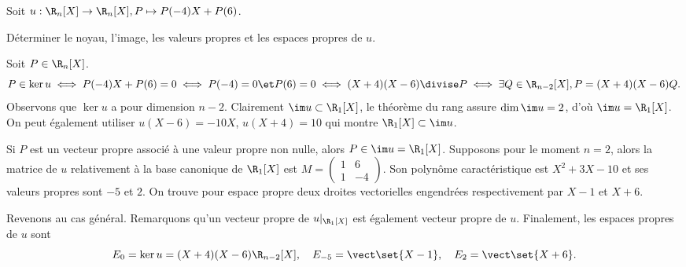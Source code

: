 \begin{enonce}
\begin{exercise}[ID={RMS121/1119 CCP PC},subtitle={},tags={mpsi}, difficulty={0}]
Soit $u:\R_n[X]\to\R_n[X], P\mapsto P(-4)X+P(6)$.

Déterminer le noyau, l'image, les valeurs propres et les espaces propres de $u$.
\end{exercise}
\begin{solution}
Soit $P\in\R_n[X]$.
\begin{equation*}
P\in\ker u
\iff P(-4)X+P(6)=0
\iff P(-4)=0 \et P(6)=0
\iff (X+4)(X-6) \divise P
\iff \exists Q\in\R_{n-2}[X], P=(X+4)(X-6)Q.
\end{equation*}
Observons que $\ker u$ a pour dimension $n-2$. Clairement $\im u\subset \R_1[X]$, le théorème du rang assure $\dim\im u=2$, d'où $\im u=\R_1[X]$. On peut également utiliser $u(X-6)=-10X$, $u(X+4)=10$ qui montre $\R_1[X]\subset\im u$.

Si $P$ est un vecteur propre associé à une valeur propre non nulle, alors $P\in\im u=\R_1[X]$. Supposons pour le moment $n=2$, alors la matrice de $u$ relativement à la base canonique de $\R_1[X]$ est
$M=\begin{pmatrix} 1& 6\\ 1&-4 \end{pmatrix}$.
Son polynôme caractéristique est $X^2+3X-10$ et ses valeurs propres sont $-5$ et $2$.
On trouve pour espace propre deux droites vectorielles engendrées respectivement par $X-1$ et $X+6$.

Revenons au cas général. 
Remarquons qu'un vecteur propre de $u|_{\R_1[X]}$ est également vecteur propre de $u$. Finalement, les espaces propres de $u$ sont
\begin{equation*}
    E_0=\ker u= (X+4)(X-6)\R_{n-2}[X],\quad
    E_{-5}=\vect\set{X-1},\quad
    E_{2}=\vect\set{X+6}.
\end{equation*}
\end{solution}
\end{enonce}
